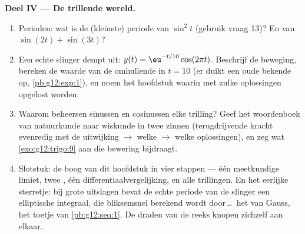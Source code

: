 \begin{problem}
\medskip
\noindent\textbf{Deel IV --- De trillende wereld.}
\begin{enumerate}[resume]
  \item Perioden: wat is de (kleinste) periode van $\sin^2 t$ (gebruik vraag
        13)? En van $\sin(2t) + \sin(3t)$?
  \item Een echte slinger dempt uit: $y(t) = \eu^{-t/10}\cos(2\pi t)$.
        Beschrijf de beweging, bereken de waarde van de omhullende in
        $t = 10$ (er duikt een oude bekende op, \cref{pb:g12:exp:1}), en noem
        het hoofdstuk waarin  met zulke oplossingen opgelost
        worden.
  \item Waarom beheersen sinussen en cosinussen elke trilling? Geef het
        woordenboek van natuurkunde naar wiskunde in twee zinnen
        (terugdrijvende kracht evenredig met de uitwijking $\rightarrow$
        welke  $\rightarrow$ welke oplossingen), en zeg wat
        \cref{exo:g12:trigo:9} aan die bewering bijdraagt.
  \item Slotstuk: de boog van dit hoofdstuk in vier stappen --- één
        meetkundige limiet, twee , één differentiaalvergelijking,
        en alle trillingen. En het eerlijke sterretje: bij grote uitslagen
        bevat de echte periode van de slinger een elliptische integraal, die
        bliksemsnel berekend wordt door\,\dots\ het 
         van Gauss, het toetje van \cref{pb:g12:seq:1}. De draden
        van de reeks knopen zichzelf aan elkaar.
\end{enumerate}
\end{problem}

